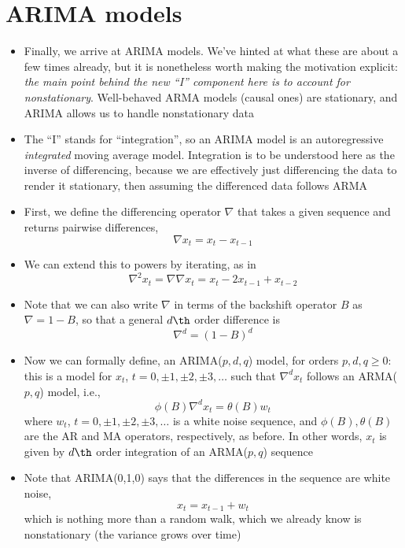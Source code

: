 \documentclass{article}
\begin{document}
\section{ARIMA models}

\begin{itemize}
\item Finally, we arrive at ARIMA models. We've hinted at what these are about a
  few times already, but it is nonetheless worth making the motivation explicit:
  \emph{the main point behind the new ``I'' component here is to account for
    nonstationary}. Well-behaved ARMA models (causal ones) are stationary, and
  ARIMA allows us to handle nonstationary data   

\item The ``I'' stands for ``integration'', so an ARIMA model is an
  autoregressive \emph{integrated} moving average model. Integration is to be
  understood here as the inverse of differencing, because we are effectively
  just differencing the data to render it stationary, then assuming the
  differenced data follows ARMA  

\item First, we define the differencing operator $\nabla$ that takes a given
  sequence and returns pairwise differences,  
  \[
  \nabla x_t = x_t - x_{t-1}
  \]

\item We can extend this to powers by iterating, as in 
  \[
  \nabla^2 x_t = \nabla \nabla x_t = x_t - 2 x_{t-1} + x_{t-2}
  \]

\item Note that we can also write $\nabla$ in terms of the backshift operator
  $B$ as $\nabla = 1 - B$, so that a general $d\th$ order difference is
  \[
  \nabla^d = (1-B)^d 
  \]

\item Now we can formally define, an ARIMA($p,d,q$) model, for orders $p,d,q  
  \geq 0$: this is a model for $x_t$, $t = 0, \pm 1, \pm 2, \pm 3, \dots$ such
  that $\nabla^d x_t$ follows an ARMA($p,q$) model, i.e., 
  \begin{equation}
  \label{eq:arima_pdq}
  \phi(B) \nabla^d x_t = \theta(B) w_t
  \end{equation}
  where $w_t$, $t = 0, \pm 1, \pm 2, \pm 3, \dots$ is a white noise sequence,
  and $\phi(B),\theta(B)$ are the AR and MA operators, respectively, as before. 
  In other words, $x_t$ is given by $d\th$ order integration of an ARMA($p,q$)
  sequence 

\item Note that ARIMA(0,1,0) says that the differences in the sequence are white
  noise, 
  \[
  x_t = x_{t-1} + w_t
  \]
  which is nothing more than a random walk, which we already know is
  nonstationary (the variance grows over time)


\end{itemize}
\end{document}
